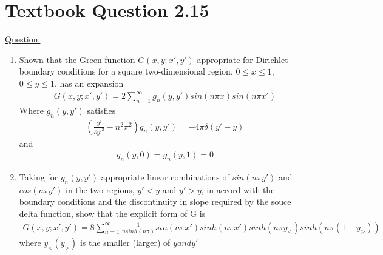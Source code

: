 \documentclass[12pt]{article}
\begin{document}
    
\newpage
\section{Textbook Question 2.15} \label{section2}
    \underline{Question: }
    \begin{enumerate}
        \item [a)] Shown that the Green function $G(x, y:x', y')$ appropriate for Dirichlet boundary conditions for a square two-dimensional region, $0 \leq x \leq 1$, $0 \leq y \leq 1$, has an expansion 
            \begin{gather*}
                G(x,y;x', y') = 2 \sum_{n=1}^\infty g_n(y,y') sin(n \pi x) sin(n \pi x')
            \end{gather*}
            Where $g_n(y,y')$ satisfies
            \begin{gather*}
                \left(\frac{\partial^2}{\partial{y'}^2} - n^2 \pi^2 \right) g_n(y,y') = -4 \pi \delta(y'-y)
            \end{gather*}
            and 
            \begin{gather*}
                g_n(y,0) = g_n(y,1) = 0
            \end{gather*}   
        \item [b)] Taking for $g_n(y,y')$ appropriate linear combinations of $sin(n \pi y')$ and $cos(n \pi y')$ in the two regions, $y' < y$ and $y' > y$, in accord with the boundary conditions and the discontinuity in slope required by the souce delta function, show that the explicit form of G is 
            \begin{gather*}
                G(x,y;x', y') = 8 \sum_{n=1}^\infty \frac{1}{n sinh(n \pi)} sin(n \pi x') sinh(n \pi x') sinh (n \pi y_<) sinh(n \pi (1-y_>))
            \end{gather*}
            where $y_<(y_>)$ is the smaller (larger) of $y and y'$
    \end{enumerate}
    
\end{document}
